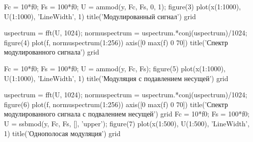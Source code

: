 \documentclass[10pt,a4paper]{report}
\begin{document}
Fc = 10*f0;\newline
Fs = 100*f0;\newline
U = ammod(y, Fc, Fs, 0, 1);\newline
figure(3)\newline
plot(x(1:1000), U(1:1000),  'LineWidth', 1)\newline
title('Модулированный сигнал')\newline
grid\newline

uspectrum = fft(U, 1024);\newline
normuspectrum = uspectrum.*conj(uspectrum)/1024;\newline
figure(4)\newline
plot(f, normuspectrum(1:256))\newline
axis([0 max(f) 0 70])\newline
title('Спектр модулированного сигнала')\newline
grid\newline

Fc = 10*f0;\newline
Fs = 100*f0;\newline
U = ammod(y, Fc, Fs);\newline
figure(5)\newline
plot(x(1:1000), U(1:1000), 'LineWidth', 1)\newline
title('Модуляция с подавлением несущей')\newline
grid\newline

uspectrum = fft(U, 1024);\newline
normuspectrum = uspectrum.*conj(uspectrum)/1024;\newline
figure(6)\newline
plot(f, normuspectrum(1:256))\newline
axis([0 max(f) 0 70])\newline
title('Спектр модулированного сигнала с подвалением несущей')\newline
grid\newline
\newline
Fc = 10*f0;\newline
Fs = 100*f0;\newline
U = ssbmod(y, Fc, Fs, [], 'upper');\newline
figure(7)\newline
plot(x(1:500), U(1:500), 'LineWidth', 1)\newline
title('Однополосая модуляция')\newline
grid\newline
\end{document}
